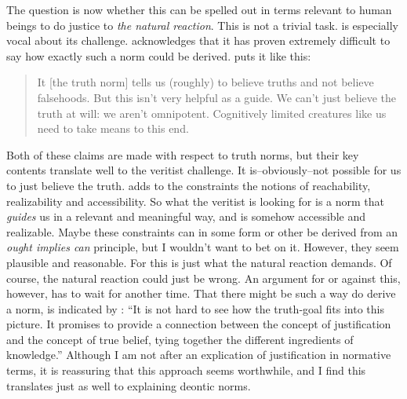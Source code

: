 \documentclass[12pt,numbers=noenddot]{scrartcl}
\begin{document}
The question is now whether this can be spelled out in terms relevant to human beings to do justice to \emph{the natural reaction}. This is not a trivial task. \textcite[Ch. 4]{Gibbons2013-GIBTNO} is especially vocal about its challenge.
\noindent \textcite[Ch. 4]{Boghossian2008-BOGCAJ} acknowledges that it has proven extremely difficult to say how exactly such a norm could be derived. \textcite[16]{Greenberg2016-GREITN} puts it like this:
\begin{quote}
It [the truth norm] tells us (roughly) to believe truths and not believe falsehoods. But this isn’t very helpful as a guide. We can’t just believe the truth at will: we aren’t omnipotent. Cognitively limited creatures like us need to take means to this end.
\end{quote}
Both of these claims are made with respect to truth norms, but their key contents translate well to the veritist challenge. It is–obviously–not possible for us to just believe the truth. \textcite[62]{Goldman2002-GOLTUO-2} adds to the constraints the notions of reachability, realizability and accessibility.
So what the veritist is looking for is a norm that \emph{guides} us in a relevant and meaningful way, and is somehow accessible and realizable. Maybe these constraints can in some form or other be derived from an \emph{ought implies can} principle, but I wouldn't want to bet on it. However, they seem plausible and reasonable. For this is just what the natural reaction demands. Of course, the natural reaction could just be wrong. An argument for or against this, however, has to wait for another time. That there might be such a way do derive a norm, is indicated by \textcite[154]{David2001-DAVTAT-7}: “It is not hard to see how the truth‐goal fits into this picture. It promises to provide a connection between the concept of justification and the concept of true belief, tying together the different ingredients of knowledge.” Although I am not after an explication of justification in normative terms, it is reassuring that this approach seems worthwhile, and I find this translates just as well to explaining deontic norms.
\end{document}
